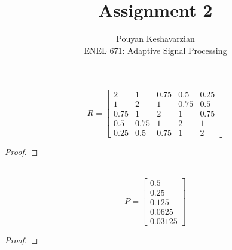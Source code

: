 \documentclass[12pt]{article}
\newenvironment{problem}[2][Problem]{\begin{trivlist}
\item[\hskip \labelsep {\bfseries #1}\hskip \labelsep {\bfseries #2.}]}{\end{trivlist}}
\begin{document}
\title{Assignment 2}
\author{Pouyan Keshavarzian\\
ENEL 671: Adaptive Signal Processing}

\maketitle

\begin{problem}{1}
\text{}
\begin{center}
  \[
  R=
    \begin{bmatrix}
      2 & 1 & 0.75 & 0.5 & 0.25 \\
      1 & 2 & 1 & 0.75 & 0.5 \\
      0.75 & 1 & 2 & 1 & 0.75 \\
      0.5 & 0.75 & 1 & 2 & 1 \\
      0.25 & 0.5 & 0.75 & 1 & 2
    \end{bmatrix}
  \]
\end{center}
\end{problem}

\begin{proof}

\end{proof}

\begin{problem}{2}
\text{ }\\
\[
P=
  \begin{bmatrix}
    0.5 \\
    0.25 \\
    0.125\\
    0.0625\\
    0.03125
  \end{bmatrix}
\]
\end{problem}

\begin{proof}

\end{proof}
\end{document}
